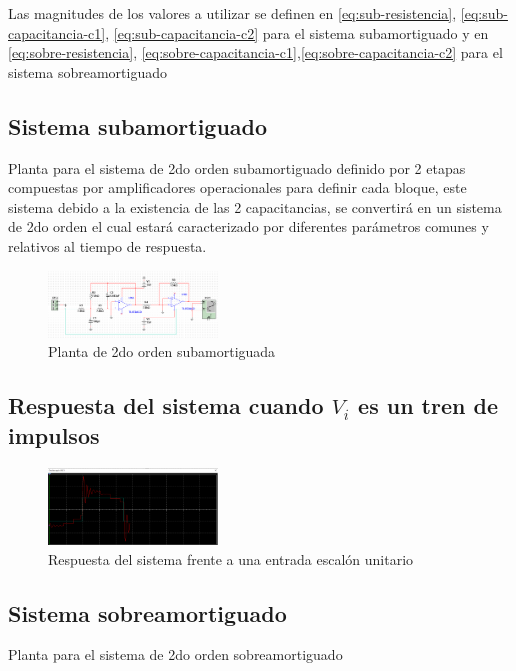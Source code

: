\documentclass[conference]{IEEEtran}
\begin{document}
	Las magnitudes de los valores a utilizar se definen en \ref{eq:sub-resistencia}, \ref{eq:sub-capacitancia-c1}, \ref{eq:sub-capacitancia-c2} para el sistema subamortiguado y en \ref{eq:sobre-resistencia}, \ref{eq:sobre-capacitancia-c1},\ref{eq:sobre-capacitancia-c2} para el sistema sobreamortiguado
	
	\subsection{Sistema subamortiguado}
	Planta para el sistema de 2do orden subamortiguado definido por 2 etapas compuestas por amplificadores operacionales para definir cada bloque, este sistema debido a la existencia de las 2 capacitancias, se convertirá en un sistema de 2do orden el cual estará caracterizado por diferentes parámetros comunes y relativos al tiempo de respuesta.
	\begin{figure}[h]
		\centering
		\includegraphics[width=0.4\textwidth]{media/sistema-subamortiguado}
		\caption{Planta de 2do orden subamortiguada}
		\label{fig:sistema-subamortiguado}
	\end{figure}
	
	\subsection{Respuesta del sistema cuando $V_i$ es un tren de impulsos}
	
	\begin{figure}[h]
		\centering
		\includegraphics[width=0.4\textwidth]{media/sub-tren-impulsos}
		\caption{Respuesta del sistema frente a una entrada escalón unitario}
		\label{fig:sub-tren-impulsos}
	\end{figure}
	
	\subsection{Sistema sobreamortiguado}
	Planta para el sistema de 2do orden sobreamortiguado
	
\end{document}
